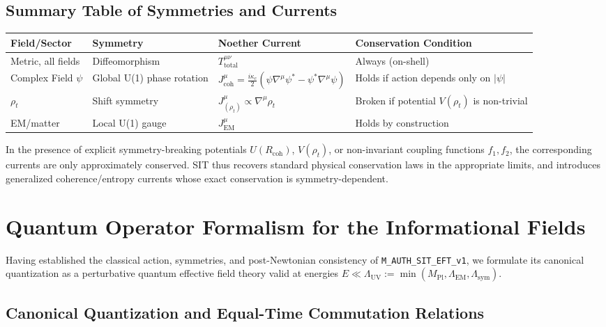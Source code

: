 \subsection{Summary Table of Symmetries and Currents}
\begin{center}
\small
\begin{tabular}{|p{}|p{}|p{}|p{}|}
\hline
\textbf{Field/Sector} & \textbf{Symmetry} & \textbf{Noether Current} & \textbf{Conservation Condition} \\
\hline
Metric, all fields & Diffeomorphism & $T^{\mu\nu}_{\text{total}}$ & Always (on-shell) \\
Complex Field $\psi$ & Global U(1) phase rotation & $J^\mu_{\mathrm{coh}} = \frac{i\kappa_c}{2}(\psi\nabla^\mu\psi^* - \psi^*\nabla^\mu\psi)$ & Holds if action depends only on $|\psi|$ \\
$\rho_t$ & Shift symmetry & $J^\mu_{(\rho_t)} \propto \nabla^\mu \rho_t$ & Broken if potential $V(\rho_t)$ is non-trivial \\
EM/matter & Local U(1) gauge & $J^\mu_{\mathrm{EM}}$ & Holds by construction \\
\hline
\end{tabular}
\end{center}

\noindent
In the presence of explicit symmetry-breaking potentials $U(R_{\mathrm{coh}})$, $V(\rho_t)$, or non-invariant coupling functions $f_1, f_2$, the corresponding currents are only approximately conserved. SIT thus recovers standard physical conservation laws in the appropriate limits, and introduces generalized coherence/entropy currents whose exact conservation is symmetry-dependent.



\section{Quantum Operator Formalism for the Informational Fields}
\label{sec:quantum-operator-formalism}
\label{sec:path-int}

Having established the classical action, symmetries, and post-Newtonian consistency of \texttt{M\_AUTH\_SIT\_EFT\_v1}, we formulate its canonical quantization as a perturbative quantum effective field theory valid at energies $E \ll \Lambda_{\mathrm{UV}} := \min(M_{\mathrm{Pl}}, \Lambda_{\mathrm{EM}}, \Lambda_{\mathrm{sym}})$.

\subsection{Canonical Quantization and Equal-Time Commutation Relations}

